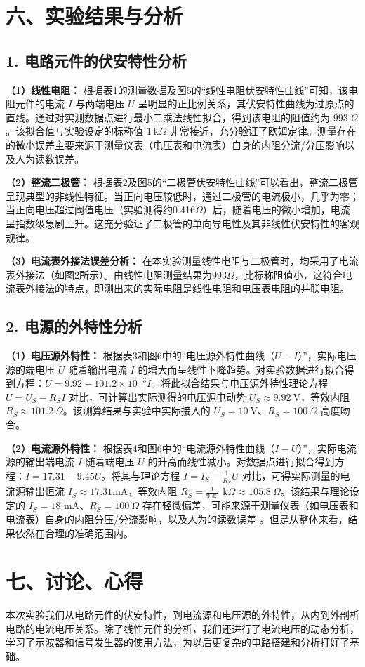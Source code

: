 \documentclass[10.5pt]{config}
\begin{document}
\section*{六、实验结果与分析}

\subsection*{1. 电路元件的伏安特性分析}
\textbf{（1）线性电阻：}
根据表1的测量数据及图5的“线性电阻伏安特性曲线”可知，该电阻元件的电流 $I$ 与两端电压 $U$ 呈明显的正比例关系，其伏安特性曲线为过原点的直线。通过对实测数据点进行最小二乘法线性拟合，得到该电阻的阻值约为 $993\ \Omega$。该拟合值与实验设定的标称值 $1\ \text{k}\Omega$ 非常接近，充分验证了欧姆定律。测量存在的微小误差主要来源于测量仪表（电压表和电流表）自身的内阻分流/分压影响以及人为读数误差。

\textbf{（2）整流二极管：}
根据表2及图5的“二极管伏安特性曲线”可以看出，整流二极管呈现典型的非线性特征。当正向电压较低时，通过二极管的电流极小，几乎为零；当正向电压超过阈值电压（实验测得约0.416$\Omega$）后，随着电压的微小增加，电流呈指数级急剧上升。这充分验证了二极管的单向导电性及其非线性伏安特性的客观规律。

\textbf{（3）电流表外接法误差分析：}
在本实验测量线性电阻与二极管时，均采用了电流表外接法（如图2所示）。由线性电阻测量结果为$993\Omega$，比标称阻值小，这符合电流表外接法的特点，即测出来的实际电阻是线性电阻和电压表电阻的并联电阻。
\subsection*{2. 电源的外特性分析}
\textbf{（1）电压源外特性：}
根据表3和图6中的“电压源外特性曲线（$U-I$）”，实际电压源的端电压 $U$ 随着输出电流 $I$ 的增大而呈线性下降趋势。对实验数据进行拟合得到方程：$U = 9.92 - 101.2 \times 10^{-3} I$。将此拟合结果与电压源外特性理论方程 $U = U_S - R_S I$ 对比，可计算出实际测得的电压源电动势 $U_S \approx 9.92\ \text{V}$，等效内阻 $R_S \approx 101.2\ \Omega$。该测算结果与实验中实际接入的 $U_S = 10\ \text{V}$、$R_S = 100\ \Omega$ 高度吻合。

\textbf{（2）电流源外特性：}
根据表4和图6中的“电流源外特性曲线（$I-U$）”，实际电流源的输出端电流 $I$ 随着端电压 $U$ 的升高而线性减小。对数据点进行拟合得到方程：$I = 17.31 - 9.45 U$。将其与理论方程 $I = I_S - \frac{1}{R_S} U$ 对比，可得实际测量的电流源输出恒流 $I_S \approx 17.31 \text{mA}$，等效内阻 $R_S = \frac{1}{9.45} \text{ k}\Omega \approx 105.8\ \Omega$。该结果与理论设定的 $I_S = 18\text{ mA}$、$R_S = 100\ \Omega$ 存在轻微偏差，可能来源于测量仪表（如电压表和电流表）自身的内阻分压/分流影响，以及人为的读数误差 。但是从整体来看，结果依然在合理的准确范围内。
\section*{七、讨论、心得}

本次实验我们从电路元件的伏安特性，到电流源和电压源的外特性，从内到外剖析电路的电流电压关系。除了线性元件的分析，我们还进行了电流电压的动态分析，学习了示波器和信号发生器的使用方法，为以后更复杂的电路搭建和分析打好了基础。
\end{document}
